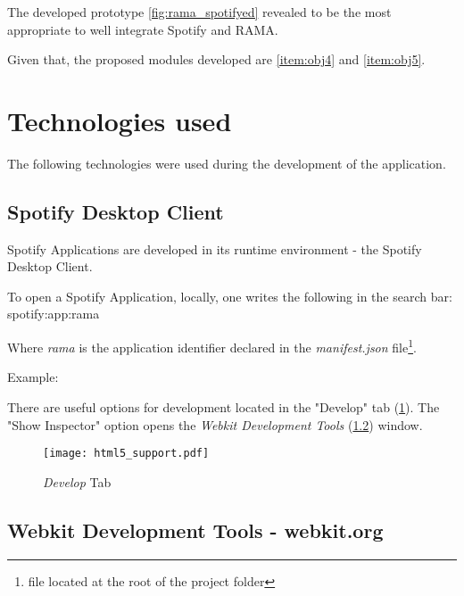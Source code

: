     The developed prototype \ref{fig:rama_spotifyed} revealed to be the most appropriate to well integrate Spotify and RAMA.

    Given that, the proposed modules developed are \ref{item:obj4} and \ref{item:obj5}.



\section{Technologies used} %
\label{sec:technologies}

  The following technologies were used during the development of the application.

  \subsection{Spotify Desktop Client} %
  \label{sub:subsection_name}
    Spotify Applications are developed in its runtime environment - the Spotify Desktop Client.

    To open a Spotify Application, locally, one writes the following in the search bar: spotify:app:rama

    Where \emph{rama} is the application identifier declared in the \emph{manifest.json} file\footnote{file located at the root of the project folder}.

    Example:

    

    There are useful options for development located in the "Develop" tab (\ref{fig:html5_support}).
    The "Show Inspector" option opens the \emph{Webkit Development Tools} (\ref{sub:webkit_tools}) window.

    \begin{figure}
      \begin{center}
        \texttt{[image: html5\_support.pdf]}
      \end{center}
      \caption{\emph{Develop} Tab}
      \label{fig:html5_support}
    \end{figure}
  
  \subsection{Webkit Development Tools - webkit.org} %
  \label{sub:webkit_tools}

